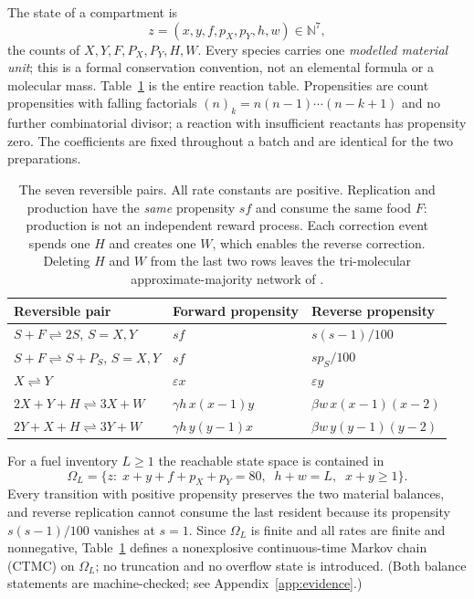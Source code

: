 \documentclass[11pt,a4paper]{article}
\theoremstyle{plain}
\theoremstyle{definition}
\theoremstyle{remark}
\newcommand{\N}{\mathbb N}
\newcommand{\eps}{\varepsilon}
\newcommand{\ff}[2]{(#1)_{#2}}
\begin{document}
The state of a compartment is
\begin{equation}
z=(x,y,f,p_X,p_Y,h,w)\in\N^7,
\end{equation}
the counts of $X,Y,F,P_X,P_Y,H,W$. Every species carries one \emph{modelled material
unit}; this is a formal conservation convention, not an elemental formula or a molecular
mass. Table~\ref{tab:source} is the entire reaction table. Propensities are count
propensities with falling factorials $\ff nk=n(n-1)\cdots(n-k+1)$ and no further
combinatorial divisor; a reaction with insufficient reactants has propensity zero. The
coefficients are fixed throughout a batch and are identical for the two preparations.

\begin{table}[htbp]\centering\small
\begin{tabular}{@{}lll@{}}\toprule
Reversible pair & Forward propensity & Reverse propensity\\\midrule
$S+F\rightleftharpoons 2S$, \quad $S=X,Y$ & $sf$ & $s(s-1)/100$\\
$S+F\rightleftharpoons S+P_S$, \quad $S=X,Y$ & $sf$ & $sp_S/100$\\
$X\rightleftharpoons Y$ & $\eps x$ & $\eps y$\\
$2X+Y+H\rightleftharpoons 3X+W$ & $\gamma h\,x(x-1)y$ & $\beta w\,x(x-1)(x-2)$\\
$2Y+X+H\rightleftharpoons 3Y+W$ & $\gamma h\,y(y-1)x$ & $\beta w\,y(y-1)(y-2)$\\
\bottomrule
\end{tabular}
\caption{The seven reversible pairs. All rate constants are positive. Replication and
production have the \emph{same} propensity $sf$ and consume the same food $F$:
production is not an independent reward process. Each correction event spends one $H$ and
creates one $W$, which enables the reverse correction. Deleting $H$ and $W$ from the last
two rows leaves the tri-molecular approximate-majority network of
\citet{condon2020}.}\label{tab:source}
\end{table}

For a fuel inventory $L\ge1$ the reachable state space is contained in
\begin{equation}
\Omega_L=\{z:\;x+y+f+p_X+p_Y=80,\;\;h+w=L,\;\;x+y\ge1\}.\label{eq:state}
\end{equation}
Every transition with positive propensity preserves the two material balances, and
reverse replication cannot consume the last resident because its propensity
$s(s-1)/100$ vanishes at $s=1$. Since $\Omega_L$ is finite and all rates are finite and
nonnegative, Table~\ref{tab:source} defines a nonexplosive continuous-time Markov chain
(CTMC) on $\Omega_L$; no truncation and no overflow state is introduced. (Both balance
statements are machine-checked; see Appendix~\ref{app:evidence}.)
\end{document}

